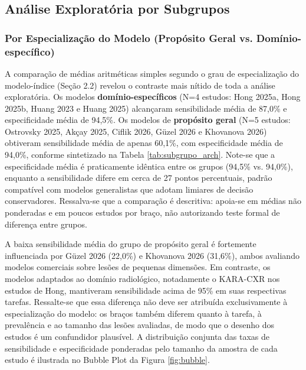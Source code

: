 \documentclass[12pt,a4paper]{article}
\begin{document}
\subsection{Análise Exploratória por Subgrupos}

\subsubsection{Por Especialização do Modelo (Propósito Geral vs. Domínio-específico)}
A comparação de médias aritméticas simples segundo o grau de especialização do modelo-índice (Seção 2.2) revelou o contraste mais nítido de toda a análise exploratória. Os modelos \textbf{domínio-específicos} (N=4 estudos: Hong 2025a, Hong 2025b, Huang 2023 e Huang 2025) alcançaram sensibilidade média de 87,0\% e especificidade média de 94,5\%. Os modelos de \textbf{propósito geral} (N=5 estudos: Ostrovsky 2025, Akçay 2025, Ciflik 2026, Güzel 2026 e Khovanova 2026) obtiveram sensibilidade média de apenas 60,1\%, com especificidade média de 94,0\%, conforme sintetizado na Tabela \ref{tab:subgrupo_arch}. Note-se que a especificidade média é praticamente idêntica entre os grupos (94,5\% vs. 94,0\%), enquanto a sensibilidade difere em cerca de 27 pontos percentuais, padrão compatível com modelos generalistas que adotam limiares de decisão conservadores. Ressalva-se que a comparação é descritiva: apoia-se em médias não ponderadas e em poucos estudos por braço, não autorizando teste formal de diferença entre grupos.

A baixa sensibilidade média do grupo de propósito geral é fortemente influenciada por Güzel 2026 (22,0\%) e Khovanova 2026 (31,6\%), ambos avaliando modelos comerciais sobre lesões de pequenas dimensões. Em contraste, os modelos adaptados ao domínio radiológico, notadamente o KARA-CXR nos estudos de Hong, mantiveram sensibilidade acima de 95\% em suas respectivas tarefas. Ressalte-se que essa diferença não deve ser atribuída exclusivamente à especialização do modelo: os braços também diferem quanto à tarefa, à prevalência e ao tamanho das lesões avaliadas, de modo que o desenho dos estudos é um confundidor plausível. A distribuição conjunta das taxas de sensibilidade e especificidade ponderadas pelo tamanho da amostra de cada estudo é ilustrada no Bubble Plot da Figura \ref{fig:bubble}.
\end{document}
